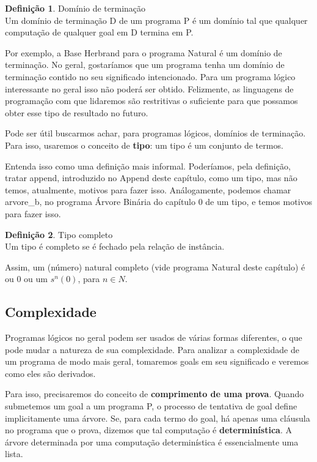 \documentclass{article}
\theoremstyle{definition}
\newtheorem{definition}{Definição}[section]
\theoremstyle{remark}
\begin{document}
\begin{definition}{Domínio de terminação}
  \\ Um domínio de terminação D de um programa P é um domínio tal que qualquer computação de qualquer goal em D termina em P.
\end{definition}

Por exemplo, a Base Herbrand para o programa Natural é um domínio de terminação.
No geral, gostaríamos que um programa tenha um domínio de terminação contido no seu significado intencionado. Para um programa lógico interessante no geral isso não poderá ser obtido. Felizmente, as linguagens de programação com que lidaremos são restritivas o suficiente para que possamos obter esse tipo de resultado no futuro.

Pode ser útil buscarmos achar, para programas lógicos, domínios de terminação. Para isso, usaremos o conceito de \textbf{tipo}: um tipo é um conjunto de termos.

Entenda isso como uma definição mais informal. Poderíamos, pela definição, tratar append, introduzido no Append deste capítulo, como um tipo, mas não temos, atualmente, motivos para fazer isso. Análogamente, podemos chamar arvore\_b, no programa Árvore Binária do capítulo 0 de um tipo, e temos motivos para fazer isso.

\begin{definition}{Tipo completo}
\\ Um tipo é completo se é fechado pela relação de instância.
\end{definition}

Assim, um (número) natural completo (vide programa Natural deste capítulo) é ou 0 ou um $s^n(0)$, para $n \in N$.

\subsection{Complexidade}

Programas lógicos no geral podem ser usados de várias formas diferentes, o que pode mudar a natureza de sua complexidade. Para analizar a complexidade de um programa de modo mais geral, tomaremos goals em seu significado e veremos como eles são derivados.

Para isso, precisaremos do conceito de \textbf{comprimento de uma prova}. Quando submetemos um goal a um programa P, o processo de tentativa de goal define implicitamente uma árvore. Se, para cada termo do goal, há apenas uma cláusula no programa que o prova, dizemos que tal computação é \textbf{determinística}. A árvore determinada por uma computação determinística é essencialmente uma lista.
\end{document}
